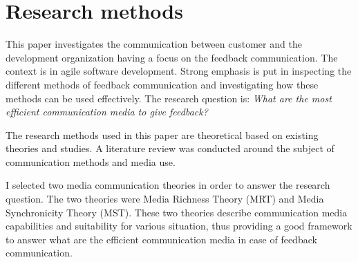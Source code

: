 \documentclass[conference]{IEEEtran}
\begin{document}
\begin{comment}

\subsection{Video conference and telephone}

\subsection{Email}

\subsection{Chat rooms}

\textbf{TODO: Synchronous vs. asynchonous methods, Email, Video conference, documents etc.}

\section{Communication and feedback methods in software projects}

\end{comment}

\section{Research methods}

This paper investigates the communication between customer and the development organization having a focus on the feedback communication. The context is in agile software development. Strong emphasis is put in inspecting the different methods of feedback communication and investigating how these methods can be used effectively. The research question is: \textit{What are the most efficient communication media to give feedback?}

The research methods used in this paper are theoretical based on existing theories and studies. A literature review was conducted around the subject of communication methods and media use.

I selected two media communication theories in order to answer the research question. The two theories were Media Richness Theory (MRT) and Media Synchronicity Theory (MST). These two theories describe communication media capabilities and suitability for various situation, thus providing a good framework to answer what are the efficient communication media in case of feedback communication.
\end{document}
